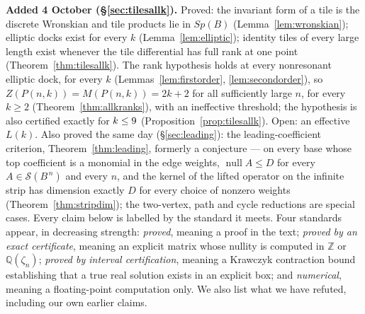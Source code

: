 \documentclass[11pt]{article}
\theoremstyle{definition}
\begin{document}
\noindent\textbf{Added 4 October (\S\ref{sec:tilesallk}).} Proved: the invariant
form of a tile is the discrete Wronskian and tile products lie in $Sp(B)$
(Lemma~\ref{lem:wronskian}); elliptic docks exist for every $k$
(Lemma~\ref{lem:elliptic}); identity tiles of every large length exist whenever
the tile differential has full rank at one point (Theorem~\ref{thm:tilesallk}).
The rank hypothesis holds at every nonresonant elliptic dock, for every $k$
(Lemmas~\ref{lem:firstorder}, \ref{lem:secondorder}), so
$Z(P(n,k))=M(P(n,k))=2k+2$ for all sufficiently large $n$, for every $k\ge2$
(Theorem~\ref{thm:allkranks}), with an ineffective threshold; the hypothesis is
also certified exactly for $k\le9$ (Proposition~\ref{prop:tilesallk}).
Open: an effective $L(k)$. Also proved the same day (\S\ref{sec:leading}): the
leading-coefficient criterion, Theorem~\ref{thm:leading}, formerly a
conjecture --- on every base whose top coefficient is a monomial in the edge
weights, $\operatorname{null}A\le D$ for every $A\in\mathcal S(B^{\,n})$ and
every $n$, and the kernel of the lifted operator on the infinite strip has
dimension exactly $D$ for every choice of nonzero weights
(Theorem~\ref{thm:stripdim}); the two-vertex, path and cycle reductions are
special cases.
Every claim below is labelled by the standard it meets. Four standards appear,
in decreasing strength: \emph{proved}, meaning a proof in the text;
\emph{proved by an exact certificate}, meaning an explicit matrix whose nullity
is computed in $\mathbb Z$ or $\mathbb Q(\zeta_n)$; \emph{proved by interval
certification}, meaning a Krawczyk contraction bound establishing that a true
real solution exists in an explicit box; and \emph{numerical}, meaning a
floating-point computation only. We also list what we have refuted, including
our own earlier claims.
\end{document}
